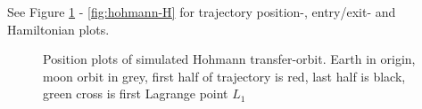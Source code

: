 See Figure \ref{fig:hohmann-position} - \ref{fig:hohmann-H} for trajectory position-, entry/exit- and Hamiltonian plots.

\begin{figure}[ht!]
    \centering
        \caption{Position plots of simulated Hohmann transfer-orbit. Earth in origin, moon orbit in grey, first half of trajectory is red, last half is black, green cross is first Lagrange point $L_1$}
        \label{fig:hohmann-position}
\end{figure}

